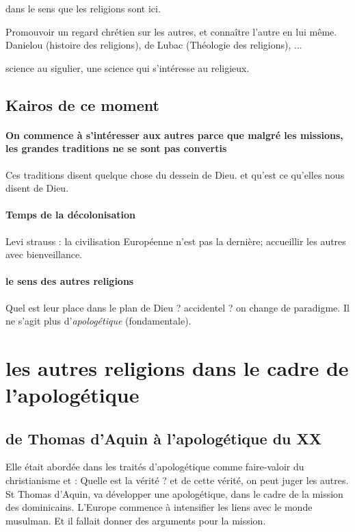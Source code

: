  dans le sens que les religions sont ici.

Promouvoir un regard chrétien sur les autres, et connaître l'autre en lui même. Danielou (histoire des religions), de Lubac (Théologie des religions), ...
\begin{Def}
science au sigulier, une science qui s'intéresse au religieux. 
\end{Def}

\subsection{Kairos de ce moment}
\paragraph{On commence à s'intéresser aux autres parce que malgré les missions, les grandes traditions ne se sont pas convertis}
Ces traditions disent quelque chose du dessein de Dieu. et qu'est ce qu'elles nous disent de Dieu.

\paragraph{Temps de la décolonisation} Levi strauss : la civilisation Européenne n'est pas la dernière; accueillir les autres avec bienveillance.

\paragraph{le sens des autres religions} Quel est leur place dans le plan de Dieu ? accidentel ?
on change de paradigme. Il ne s'agit plus d'\emph{apologétique} (fondamentale).

\section{les autres religions dans le cadre de l'apologétique}

\subsection{de Thomas d'Aquin à l'apologétique du XX}

Elle était abordée dans les traités d'apologétique comme faire-valoir du christianisme et : 
Quelle est la vérité ? et de cette vérité, on peut juger les autres.
St Thomas d'Aquin,  va développer une apologétique, dans le cadre de la mission des dominicains. L'Europe commence à intensifier les liens avec le monde musulman. Et il fallait donner des arguments pour la mission. 
